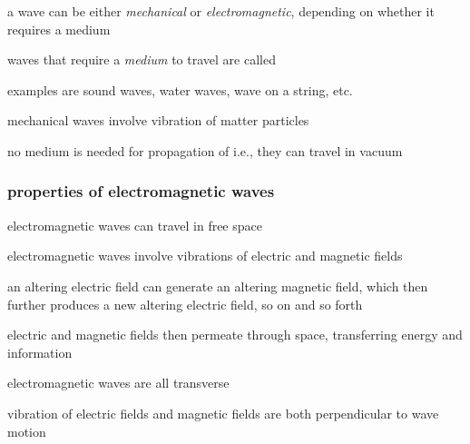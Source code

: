 a wave can be either \emph{mechanical} or \emph{electromagnetic}, depending on whether it requires a medium

\cmt waves that require a \emph{medium} to travel are called 

examples are sound waves, water waves, wave on a string, etc.

mechanical waves involve vibration of matter particles

\cmt no medium is needed for propagation of  i.e., they can travel in vacuum



\subsubsection{properties of electromagnetic waves}

\cmt electromagnetic waves can travel in free space

\cmt electromagnetic waves involve vibrations of electric and magnetic fields
	
an altering electric field can generate an altering magnetic field, which then further produces a new altering electric field, so on and so forth

electric and magnetic fields then permeate through space, transferring energy and information
	
\cmt electromagnetic waves are all transverse
	
vibration of electric fields and magnetic fields are both perpendicular to wave motion

